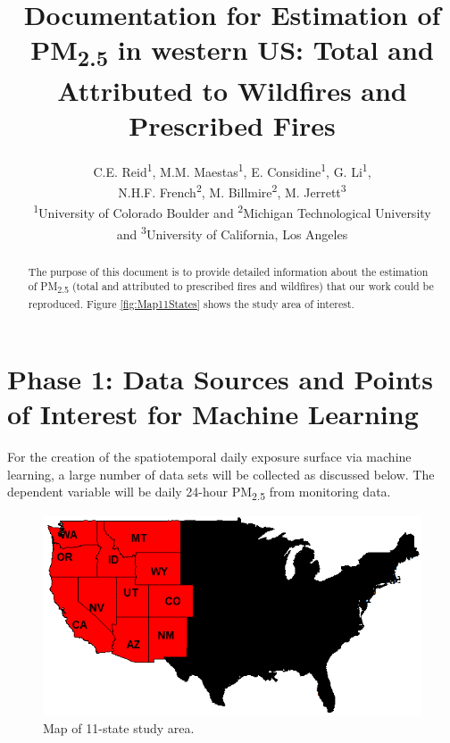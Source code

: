 \documentclass[letterpaper,12pt]{article}
\title{Documentation for Estimation of PM\textsubscript{2.5} in western US: Total and Attributed to Wildfires and Prescribed Fires}
\author{C.E. Reid\textsuperscript{1}, 
M.M. Maestas\textsuperscript{1}, 
E. Considine\textsuperscript{1}, 
G. Li\textsuperscript{1}, \\
N.H.F. French\textsuperscript{2}, 
M. Billmire\textsuperscript{2}, 
M. Jerrett\textsuperscript{3} \\ \textsuperscript{1}University of Colorado Boulder and \textsuperscript{2}Michigan Technological University \\ and \textsuperscript{3}University of California, Los Angeles}
\begin{document}
\selectfont
{}

\maketitle

\begin{abstract}
The purpose of this document is to provide detailed information about the estimation of PM\textsubscript{2.5} (total and attributed to prescribed fires and wildfires) that our work could be reproduced. Figure \ref{fig:Map11States} shows the study area of interest.
\end{abstract}

\tableofcontents



\pagebreak
\section{Phase 1: Data Sources and Points of Interest for Machine Learning}
For the creation of the spatiotemporal daily exposure surface via machine learning, a large number of data sets will be collected as discussed below. The dependent variable will be daily 24-hour PM\textsubscript{2.5} from monitoring data.  

\begin{figure}[H] %
\includegraphics[width=1\textwidth]{WesternStatesNoTitleCropped.png} %
\caption{\label{fig:Map11States}Map of 11-state study area.} %
\end{figure} %
\end{document}

